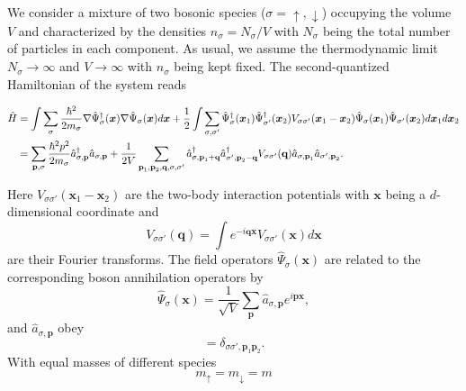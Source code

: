 \documentclass[reprint,superscriptaddress,showpacs,nofootinbib,aps,pra]{revtex4-1}
\begin{document}
We consider a mixture of two bosonic species ($\sigma=\uparrow,\downarrow$) occupying the volume $V$ and characterized by the densities $n_\sigma=N_\sigma/V$ with $N_\sigma$ being the total number of particles in each component. As usual, we assume the thermodynamic limit $N_\sigma\rightarrow\infty$ and $V\rightarrow\infty$ with $n_\sigma$ being kept fixed. The second-quantized Hamiltonian of the system reads
\begin{widetext}
\begin{equation}
\label{Hamiltonian}
\begin{split}
\hat H&=\int\sum_\sigma\frac{\hbar^2}{2m_\sigma}\nabla\hat\Psi^\dagger_\sigma(\bm x)\nabla\hat\Psi_\sigma(\bm x) d\bm x+\frac{1}{2}\int\sum_{\sigma,\sigma'}\hat\Psi^{\dag}_{\sigma}(\bm x_1)\hat\Psi^{\dag}_{\sigma'}(\bm x_2)V_{\sigma\sigma'}(\bm x_1-\bm x_2)\hat\Psi_{\sigma}(\bm x_1)\hat\Psi_{\sigma'}(\bm x_2)d\bm x_1 d\bm x_2\\
&=\sum_{\textbf{p},\sigma}\frac{\hbar^2p^2}{2m_\sigma}\hat a_{\sigma, \textbf{p}}^{\dag} \hat a_{\sigma, \textbf{p}}+\frac{1}{2V}\sum_{\textbf p_1,\textbf p_2,\textbf{q},\sigma,\sigma^\prime}\hat a_{\sigma, \textbf p_1+\textbf q}^{\dag} \hat a_{\sigma^\prime,\textbf p_2-\textbf q}^{\dag} V_{\sigma\sigma^\prime}(\textbf{q})\hat a_{\sigma, \textbf p_1}\hat a_{\sigma^\prime,\textbf p_2}.
\end{split}
\end{equation}
\end{widetext}
Here $V_{\sigma\sigma'}(\bm x_1-\bm x_2)$ are the two-body interaction potentials with $\bm x$ being a $d$-dimensional coordinate and
\begin{equation}
V_{\sigma\sigma'}(\bm q)=\int e^{-i\bm q\bm x}V_{\sigma\sigma'}(\bm x)d\bm x
\end{equation}
are their Fourier transforms. The field operators $\hat\Psi_\sigma(\bm x)$ are related to the corresponding boson annihilation operators by
\begin{equation}\label{Psi1}
\hat\Psi_\sigma(\bm x)=\frac{1}{\sqrt{V}} \sum_{\textbf{p}} \hat a_{\sigma, \bm p} e^{i \bm p \bm x},
\end{equation}
and $\hat a_{\sigma, \bm p}$ obey
\begin{equation}
[\hat a_{\sigma, \bm p_1},\hat a_{\sigma', \bm p_2}^\dagger]=\delta_{\sigma\sigma',\bm p_1\bm p_2}.
\end{equation}             
With equal masses of different species 
\begin{equation}
\label{EqMasses}
m_\uparrow=m_\downarrow=m
\end{equation}
\end{document}
